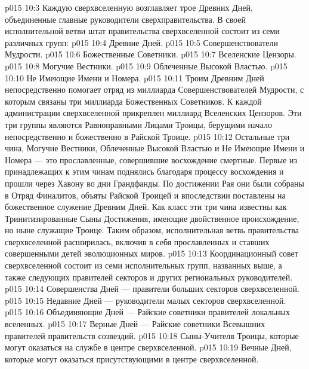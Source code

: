 \vs p015 10:3 \pc Каждую сверхвселенную возглавляет трое Древних Дней, объединенные главные руководители сверхправительства. В своей исполнительной ветви штат правительства сверхвселенной состоит из семи различных групп:
\vs p015 10:4 \bibnobreakspace Древние Дней.
\vs p015 10:5 \bibnobreakspace Совершенствователи Мудрости.
\vs p015 10:6 \bibnobreakspace Божественные Советники.
\vs p015 10:7 \bibnobreakspace Вселенские Цензоры.
\vs p015 10:8 \bibnobreakspace Могучие Вестники.
\vs p015 10:9 \bibnobreakspace Облеченные Высокой Властью.
\vs p015 10:10 \bibnobreakspace Не Имеющие Имени и Номера.
\vs p015 10:11 \pc Троим Древним Дней непосредственно помогает отряд из миллиарда Совершенствователей Мудрости, с которым связаны три миллиарда Божественных Советников. К каждой администрации сверхвселенной прикреплен миллиард Вселенских Цензоров. Эти три группы являются Равноправными Лицами Троицы, берущими начало непосредственно и божественно в Райской Троице.
\vs p015 10:12 Остальные три чина, Могучие Вестники, Облеченные Высокой Властью и Не Имеющие Имени и Номера --- это прославленные, совершившие восхождение смертные. Первые из принадлежащих к этим чинам поднялись благодаря процессу восхождения и прошли через Хавону во дни Грандфанды. По достижении Рая они были собраны в Отряд Финалитов, объяты Райской Троицей и впоследствии поставлены на божественное служение Древним Дней. Как класс эти три чина известны как Тринитизированные Сыны Достижения, имеющие двойственное происхождение, но ныне служащие Троице. Таким образом, исполнительная ветвь правительства сверхвселенной расширилась, включив в себя прославленных и ставших совершенными детей эволюционных миров.
\vs p015 10:13 Координационный совет сверхвселенной состоит из семи исполнительных групп, названных выше, а также следующих правителей секторов и других региональных руководителей.
\vs p015 10:14 \bibnobreakspace Совершенства Дней --- правители больших секторов сверхвселенной.
\vs p015 10:15 \bibnobreakspace Недавние Дней --- руководители малых секторов сверхвселенной.
\vs p015 10:16 \bibnobreakspace Объединяющие Дней --- Райские советники правителей локальных вселенных.
\vs p015 10:17 \bibnobreakspace Верные Дней --- Райские советники Всевышних правителей правительств созвездий.
\vs p015 10:18 \bibnobreakspace Сыны\hyp{}Учителя Троицы, которые могут оказаться на службе в центре сверхвселенной.
\vs p015 10:19 \bibnobreakspace Вечные Дней, которые могут оказаться присутствующими в центре сверхвселенной.
